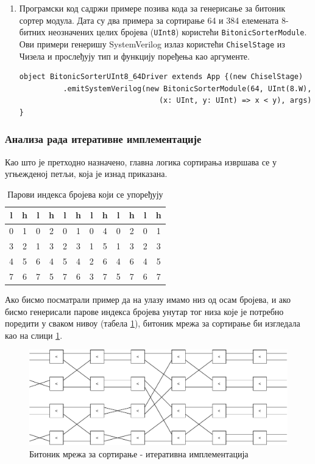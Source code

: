 \documentclass[12pt, a4paper]{article}
\theoremstyle{definition}
\begin{document}
\begin{enumerate}
\item Програмски код садржи примере позива кода за генерисање за битоник сортер модула. Дата су два примера за сортирање 64 и 384 елемената 8-битних неозначених целих бројева (\verb+UInt8+) користећи \verb+BitonicSorterModule+.
\newpage
Ови примери генеришу SystemVerilog излаз користећи \verb+ChiselStage+ из Чизела и прослеђују тип и функцију поређења као аргументе.
\begin{verbatim}
object BitonicSorterUInt8_64Driver extends App {(new ChiselStage)
          .emitSystemVerilog(new BitonicSorterModule(64, UInt(8.W),
                                (x: UInt, y: UInt) => x < y), args)
}
\end{verbatim}

\end{enumerate}

\subsubsection{Анализа рада итеративне имплементације}
Као што је претходно назначено, главна логика сортирања извршава се у угњежденој петљи, која је изнад приказана.
\begin{table}[H]
\centering
 \begin{tabular}{| c c | c c | c c | c c | c c | c c |}
  \hline
  l & h & l & h & l & h & l & h & l & h & l & h \\
  \hline
  0 & 1 & 0 & 2 & 0 & 1 & 0 & 4 & 0 & 2 & 0 & 1 \\
  3 & 2 & 1 & 3 & 2 & 3 & 1 & 5 & 1 & 3 & 2 & 3 \\
  4 & 5 & 6 & 4 & 5 & 4 & 2 & 6 & 4 & 6 & 4 & 5 \\
  7 & 6 & 7 & 5 & 7 & 6 & 3 & 7 & 5 & 7 & 6 & 7 \\
  \hline
 \end{tabular}
 \caption{Парови индекса бројева који се упоређују}
 \label{tab:index}
\end{table}
Ако бисмо посматрали пример да на улазу имамо низ од осам бројева, и ако бисмо генерисали парове индекса бројева унутар тог низа које је потребно поредити у сваком нивоу (табела \ref{tab:index}), битоник мрежа за сортирање би изгледала као на слици \ref{fig:bitonicIter}.

\begin{figure}[H]
  \centering
      \includegraphics[scale=0.7]{slike/bitonicIter.pdf}
  \caption{Битоник мрежа за сортирање - итеративна имплементација}
  \label{fig:bitonicIter}
\end{figure}
\end{document}
